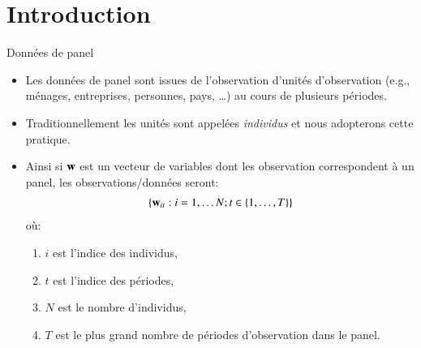 \section{Introduction}
\frame{\sectionpage}
\begin{frame}[allowframebreaks]{Données de panel}
\begin{itemize}
\item Les données de panel sont issues de l'observation d'unités d'observation (e.g., ménages, entreprises, personnes, pays, \ldots)
 au cours de plusieurs périodes. 
 \item Traditionnellement les unités sont appelées \emph{individus} et nous adopterons cette pratique.
\item Ainsi si ${\mathbf w}$ est un vecteur de variables dont les observation correspondent à un panel, 
les observations/données seront:
\begin{align*}
    \left\{{\mathbf w}_{it} : i = 1, \ldots N; t\in\{1, \ldots, T\}\right\}
\end{align*}
où:
\begin{enumerate}[$\star$]
    \item $i$ est l'indice des individus,
    \item $t$ est l'indice des périodes,
    \item $N$ est le nombre d'individus,
    \item $T$ est le plus grand nombre de périodes d'observation dans le panel.
\end{enumerate}
\end{itemize}

\end{frame}
